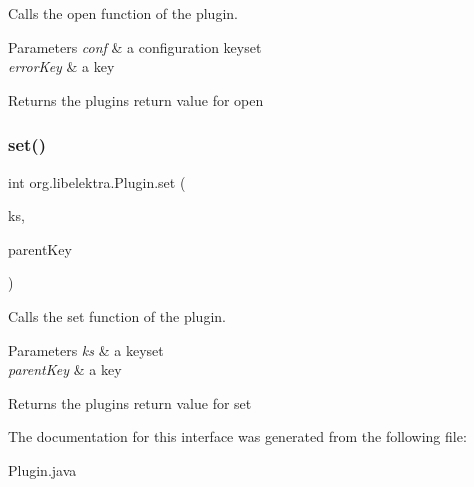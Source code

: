 Calls the open function of the plugin. 


\begin{DoxyParams}{Parameters}
{\em conf} & a configuration keyset \\
\hline
{\em error\+Key} & a key \\
\hline
\end{DoxyParams}
\begin{DoxyReturn}{Returns}
the plugin\textquotesingle{}s return value for open 
\end{DoxyReturn}
\mbox{\label{interfaceorg_1_1libelektra_1_1Plugin_a650ce789086f5becf21c5f91fad4c42e}} 
\subsubsection{\texorpdfstring{set()}{set()}}
{\footnotesize\ttfamily int org.\+libelektra.\+Plugin.\+set (\begin{DoxyParamCaption}\item[{\hyperlink{classorg_1_1libelektra_1_1KeySet}{Key\+Set}}]{ks,  }\item[{\hyperlink{classorg_1_1libelektra_1_1Key}{Key}}]{parent\+Key }\end{DoxyParamCaption})}



Calls the set function of the plugin. 


\begin{DoxyParams}{Parameters}
{\em ks} & a keyset \\
\hline
{\em parent\+Key} & a key \\
\hline
\end{DoxyParams}
\begin{DoxyReturn}{Returns}
the plugin\textquotesingle{}s return value for set 
\end{DoxyReturn}


The documentation for this interface was generated from the following file\+:\begin{DoxyCompactItemize}
\item 
Plugin.\+java\end{DoxyCompactItemize}
